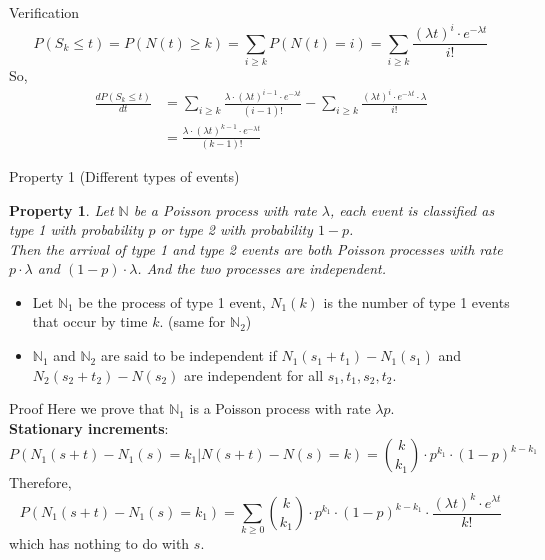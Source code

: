 \documentclass[mathserif]{beamer}
\newtheorem{pty}{Property}
\begin{document}
\begin{frame}{Verification}
\[
P(S_k \leq t) = P(N(t) \geq k) = \sum_{i\geq k} P(N(t) = i) = \sum_{i\geq k} \frac{(\lambda t)^i \cdot e^{-\lambda t}}{i!}
\]
So,
\begin{align*}
\frac{d P(S_k \leq t)}{dt} & = \sum_{i\geq k}\frac{\lambda\cdot(\lambda t)^{i-1}\cdot e^{-\lambda t}}{(i-1)!}
	- \sum_{i\geq k}\frac{(\lambda t)^i \cdot e^{-\lambda t} \cdot \lambda}{i!} \\
& = \frac{\lambda\cdot (\lambda t)^{k-1}\cdot e^{-\lambda t}}{(k-1)!}
\end{align*}
\end{frame}

\begin{frame}{Property 1 (Different types of events)}\label{property_1}
\begin{pty}
Let $\mathbb{N}$ be a Poisson process with rate $\lambda$, 
each event is classified as type 1 with probability $p$ or type 2 with probability $1-p$.\\
Then the arrival of type 1 and type 2 events are both Poisson processes with rate $p\cdot\lambda$ and $(1-p)\cdot\lambda$.
And the two processes are independent.
\end{pty}
\begin{itemize}
\item Let $\mathbb{N}_1$ be the process of type 1 event, 
$N_1(k)$ is the number of type 1 events that occur by time $k$. (same for $\mathbb{N}_2$)
\item $\mathbb{N}_1$ and $\mathbb{N}_2$ are said to be independent if $N_1(s_1+t_1) - N_1(s_1)$ and $N_2(s_2+t_2) - N(s_2)$ are independent for all $s_1, t_1, s_2, t_2$.
\end{itemize}
\end{frame}

\begin{frame}{Proof}
Here we prove that $\mathbb{N}_1$ is a Poisson process with rate $\lambda p$.\\
\vspace{\baselineskip}
\textbf{Stationary increments}:
\[
P(N_1(s+t) - N_1(s) = k_1 | N(s+t) - N(s) = k) = \binom{k}{k_1}\cdot p^{k_1}\cdot (1-p)^{k-k_1}
\]
Therefore,
\[
P(N_1(s+t) - N_1(s) = k_1) = \sum_{k\geq 0} \binom{k}{k_1}\cdot p^{k_1}\cdot (1-p)^{k-k_1}
	\cdot \frac{(\lambda t)^k\cdot e^{\lambda t}}{k!}
\]
which has nothing to do with $s$.
\end{frame}
\end{document}
